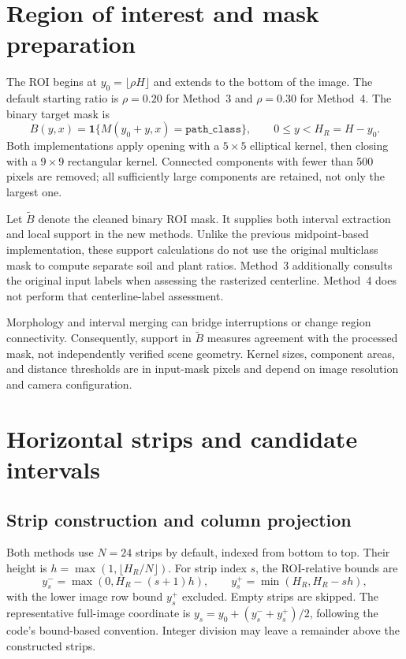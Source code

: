 \section{Region of interest and mask preparation}
\label{sec:c4_roi}

The ROI begins at $y_0=\lfloor\rho H\rfloor$ and extends to the bottom
of the image. The default starting ratio is $\rho=0.20$ for Method~3
and $\rho=0.30$ for Method~4. The binary target mask is
\begin{equation}
    B(y,x)=\mathbf{1}\{M(y_0+y,x)=\texttt{path\_class}\},
    \qquad 0\leq y<H_R=H-y_0.
\end{equation}
Both implementations apply opening with a $5\times5$ elliptical kernel,
then closing with a $9\times9$ rectangular kernel. Connected components
with fewer than 500 pixels are removed; all sufficiently large components
are retained, not only the largest one.

Let $\widetilde B$ denote the cleaned binary ROI mask. It supplies both
interval extraction and local support in the new methods. Unlike the
previous midpoint-based implementation, these support calculations do
not use the original multiclass mask to compute separate soil and plant
ratios. Method~3 additionally consults the original input labels when
assessing the rasterized centerline. Method~4 does not perform that
centerline-label assessment.

Morphology and interval merging can bridge interruptions or change region
connectivity. Consequently, support in $\widetilde B$ measures agreement
with the processed mask, not independently verified scene geometry.
Kernel sizes, component areas, and distance thresholds are in input-mask
pixels and depend on image resolution and camera configuration.

\section{Horizontal strips and candidate intervals}
\label{sec:c4_candidates}

\subsection{Strip construction and column projection}
\label{subsec:c4_strips}

Both methods use $N=24$ strips by default, indexed from bottom to top.
Their height is $h=\max(1,\lfloor H_R/N\rfloor)$. For strip index $s$,
the ROI-relative bounds are
\begin{equation}
    y_s^- = \max(0,H_R-(s+1)h),\qquad
    y_s^+ = \min(H_R,H_R-sh),
\end{equation}
with the lower image row bound $y_s^+$ excluded. Empty strips are skipped.
The representative full-image coordinate is
$y_s=y_0+(y_s^-+y_s^+)/2$, following the code's bound-based convention.
Integer division may leave a remainder above the constructed strips.

